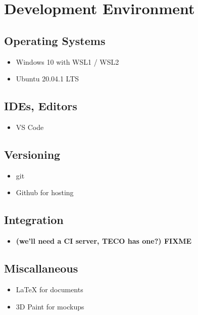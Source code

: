 \section{Development Environment}
\subsection{Operating Systems}
\begin{itemize}
    \item Windows 10 with WSL1 / WSL2
    \item Ubuntu 20.04.1 LTS
\end{itemize}
\subsection{IDEs, Editors}
\begin{itemize}
    \item VS Code
\end{itemize}
\subsection{Versioning}
\begin{itemize}
    \item git
    \item Github for hosting
\end{itemize}
\subsection{Integration}
\begin{itemize}
    \item \textbf{(we'll need a CI server, TECO has one?) FIXME}
\end{itemize}
\subsection{Miscallaneous}
\begin{itemize}
    \item {\LaTeX} for documents
    \item 3D Paint for mockups %
\end{itemize}
